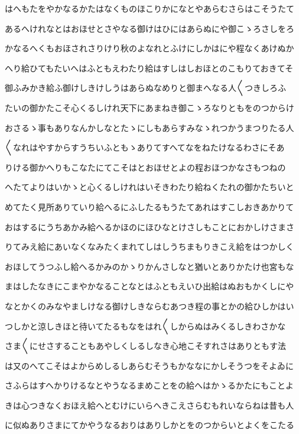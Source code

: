 \documentclass[a4paper,11pt,landscape]{ltjtarticle}
\begin{document}
はへもたをやかなるかたはなくものほこりかになとやあらむさらはこそうたて
\par\medskip
あるへけれなとはおほせとさやなる御けはひにはあらぬにや御こゝろさしをろ
\par\medskip
かなるへくもおほされさりけり秋のよなれとふけにしかはにや程なくあけぬか
\par\medskip
へり給ひてもたいへはふともえわたり給はすしはしおほとのこもりておきてそ
\par\medskip
御ふみかき給ふ御けしきけしうはあらぬなめりと御まへなる人〱つきしろふ
\par\medskip
たいの御かたこそ心くるしけれ天下にあまねき御こゝろなりともをのつからけ
\par\medskip
おさるゝ事もありなんかしなとたゝにしもあらすみなゝれつかうまつりたる人
\par\medskip
〱なれはやすからすうちいふともゝありてすへてなをねたけなるわさにそあ
\par\medskip
りける御かへりもこなたにてこそはとおほせとよの程おほつかなさもつねの
\par\medskip
へたてよりはいかゝと心くるしけれはいそきわたり給ねくたれの御かたちいと
\par\medskip
めてたく見所ありていり給へるにふしたるもうたてあれはすこしおきあかりて
\par\medskip
おはするにうちあかみ給へるかほのにほひなとけさしもことにおかしけさまさ
\par\medskip
りてみえ給にあいなくなみたくまれてしはしうちまもりきこえ給をはつかしく
\par\medskip
おほしてうつふし給へるかみのかゝりかんさしなと猶いとありかたけ也宮もな
\par\medskip
まはしたなきにこまやかなることなとはふともえいひ出給はぬおもかくしにや
\par\medskip
なとかくのみなやましけなる御けしきならむあつき程の事とかの給ひしかはい
\par\medskip
つしかと涼しきほと待いてたるもなをはれ〱しからぬはみくるしきわさかな
\par\medskip
さま〱にせさすることもあやしくしるしなき心地こそすれさはありともす法
\par\medskip
は又のへてこそはよからめしるしあらむそうもかななにかしそうつをそよゐに
\par\medskip
さふらはすへかりけるなとやうなるまめことをの給へはかゝるかたにもことよ
\par\medskip
きは心つきなくおほえ給へとむけにいらへきこえさらむもれいならねは昔も人
\par\medskip
に似ぬありさまにてかやうなるおりはありしかとをのつからいとよくをこたる
\end{document}
